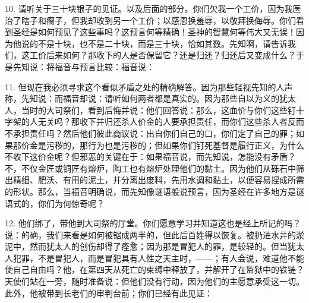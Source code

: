 10. 请听关于三十块银子的见证。以及后面的部分。你们欠我一个工价，因为我医治了瞎子和瘸子，但我却收到另一个工价；以感恩换羞辱，以敬拜换侮辱。你们看到圣经是如何预见了这些事吗？这预言何等精确！圣神的智慧何等伟大又无误！因为他说的不是十块，也不是二十块，而是三十块，恰如其数。先知啊，请告诉我们，这工价后来如何？那收下的人是否保留它？还是归还？归还后又变成什么？于是先知说：将福音与预言比较：福音说：\par

11. 但现在我必须寻求这个看似矛盾之处的精确解答。因为那些轻视先知的人声称，先知说：而福音却说：请听如何两者都是真实的。因为那些自以为义的犹太人，当时的大司祭们，看到后悔并说：他们回答说：那么，这血价与你们这些钉十字架的人无关吗？那收下并归还杀人价金的人要承担责任，而你们这些杀人者反而不承担责任吗？然后他们彼此商议说：出自你们自己的口，你们定了自己的罪；如果那价金是污秽的，那行为也是污秽的；但如果你们钉死基督是履行正义，为什么不收下这价金呢？但邪恶的关键在于：如果福音说，而先知说，怎能没有矛盾？不，不仅金匠或铜匠有熔炉，陶工也有熔炉处理他们的黏土。因为他们从砾石中筛出精细、肥沃、有用的泥土，并分离出废料，先用水调和黏土，以便容易捏成所需的形状。那么，当福音明确说，而先知像谜语般说预言，因为圣经在许多地方是谜语式的，你们为何惊奇呢？\par

12. 他们绑了，带他到大司祭的厅堂。你们愿意学习并知道这也是经上所记的吗？说：的确，我们来看是如何被锯成两半的，但此后百姓得以恢复。被扔进水井的淤泥中，然而犹太人的创伤却得了痊愈；因为那是冒犯人的罪，是较轻的。但当犹太人犯罪，不是冒犯人，而是冒犯具有人性之天主时，——；有人会说，难道他不能使自己自由吗？他，在第四天从死亡的束缚中释放了，并解开了在监狱中的铁链？天使们站在一旁，随时准备说：但他们没有行动，因为他们的主愿意承受这一切。此外，他被带到长老们的审判台前；你们已经有此见证：\par

